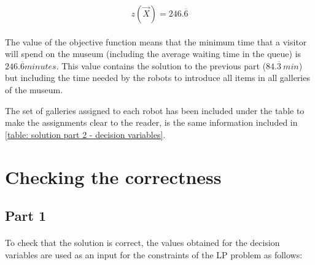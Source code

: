 \begin{equation}
    z(\vec{X}) = 246.\overline{6}
    \label{eq: solution part 2 - objective function}
\end{equation}

\paragraph{}
The value of the objective function means that the minimum time that a visitor will spend on the museum (including the average waiting time in the queue) is $246.\overline{6} minutes$. This value contains the solution to the previous part ($84.\overline{3}\ min$) but including the time needed by the robots to introduce all items in all galleries of the museum.

The set of galleries assigned to each robot has been included under the table to make the assignments clear to the reader, is the same information included in \ref{table: solution part 2 - decision variables}.


\section{Checking the correctness}

\subsection{Part 1}

\paragraph{}
To check that the solution is correct, the values obtained for the decision variables are used as an input for the constraints of the LP problem as follows:

